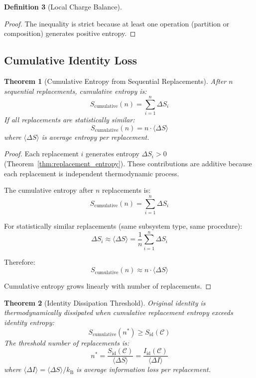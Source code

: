 \documentclass[12pt,a4paper]{article}
\theoremstyle{plain}
\newtheorem{theorem}{Theorem}[section]
\theoremstyle{definition}
\newtheorem{definition}[theorem]{Definition}
\theoremstyle{remark}
\newcommand{\kB}{k_{\mathrm{B}}}
\begin{document}
\begin{definition}[Local Charge Balance]
\begin{proof}
The inequality is strict because at least one operation (partition or composition) generates positive entropy.
\end{proof}

\subsection{Cumulative Identity Loss}

\begin{theorem}[Cumulative Entropy from Sequential Replacements]
\label{thm:cumulative}
After $n$ sequential replacements, cumulative entropy is:
\begin{equation}
S_{\text{cumulative}}(n) = \sum_{i=1}^{n} \Delta S_i
\end{equation}
If all replacements are statistically similar:
\begin{equation}
S_{\text{cumulative}}(n) = n \cdot \langle \Delta S \rangle
\end{equation}
where $\langle \Delta S \rangle$ is average entropy per replacement.
\end{theorem}

\begin{proof}
Each replacement $i$ generates entropy $\Delta S_i > 0$ (Theorem~\ref{thm:replacement_entropy}). These contributions are additive because each replacement is independent thermodynamic process.

The cumulative entropy after $n$ replacements is:
\begin{equation}
S_{\text{cumulative}}(n) = \sum_{i=1}^{n} \Delta S_i
\end{equation}

For statistically similar replacements (same subsystem type, same procedure):
\begin{equation}
\Delta S_i \approx \langle \Delta S \rangle = \frac{1}{n} \sum_{i=1}^{n} \Delta S_i
\end{equation}

Therefore:
\begin{equation}
S_{\text{cumulative}}(n) \approx n \cdot \langle \Delta S \rangle
\end{equation}

Cumulative entropy grows linearly with number of replacements.
\end{proof}

\begin{theorem}[Identity Dissipation Threshold]
\label{thm:threshold}
Original identity is thermodynamically dissipated when cumulative replacement entropy exceeds identity entropy:
\begin{equation}
S_{\text{cumulative}}(n^*) \geq S_{\text{id}}(\mathcal{C})
\end{equation}
The threshold number of replacements is:
\begin{equation}
n^* = \frac{S_{\text{id}}(\mathcal{C})}{\langle \Delta S \rangle} = \frac{I_{\text{id}}(\mathcal{C})}{\langle \Delta I \rangle}
\end{equation}
where $\langle \Delta I \rangle = \langle \Delta S \rangle / \kB$ is average information loss per replacement.
\end{theorem}


\end{definition}
\end{document}
